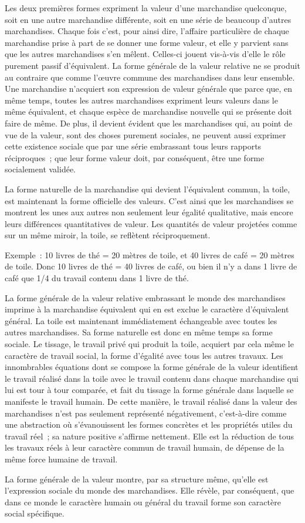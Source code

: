 \documentclass[french,twoside]{book} %
\begin{document}
Les deux premières formes expriment la valeur d’une marchandise quelconque, soit en une autre marchandise différente, soit en une série de beaucoup d’autres marchandises. Chaque fois c’est, pour ainsi dire, l’affaire particulière de chaque marchandise prise à part de se donner une forme valeur, et elle y parvient sans que les autres marchandises s’en mêlent. Celles-ci jouent vis-à-vis d’elle le rôle purement passif d’équivalent. La forme générale de la valeur relative ne se produit au contraire que comme l’œuvre commune des marchandises dans leur ensemble. Une marchandise n’acquiert son expression de valeur générale que parce que, en même temps, toutes les autres marchandises expriment leurs valeurs dans le même équivalent, et chaque espèce de marchandise nouvelle qui se présente doit faire de même. De plus, il devient évident que les marchandises qui, au point de vue de la valeur, sont des choses purement sociales, ne peuvent aussi exprimer cette existence sociale que par une série embrassant tous leurs rapports réciproques ; que leur forme valeur doit, par conséquent, être une forme socialement validée.\par
La forme naturelle de la marchandise qui devient l’équivalent commun, la toile, est maintenant la forme officielle des valeurs. C’est ainsi que les marchandises se montrent les unes aux autres non seulement leur égalité qualitative, mais encore leurs différences quantitatives de valeur. Les quantités de valeur projetées comme sur un même miroir, la toile, se reflètent réciproquement.\par
Exemple : 10 livres de thé = 20 mètres de toile, et 40 livres de café = 20 mètres de toile. Donc 10 livres de thé = 40 livres de café, ou bien il n’y a dans 1 livre de café que 1/4 du travail contenu dans 1 livre de thé.\par
La forme générale de la valeur relative embrassant le monde des marchandises imprime à la marchandise équivalent qui en est exclue le caractère d’équivalent général. La toile est maintenant immédiatement échangeable avec toutes les autres marchandises. Sa forme naturelle est donc en même temps sa forme sociale. Le tissage, le travail privé qui produit la toile, acquiert par cela même le caractère de travail social, la forme d’égalité avec tous les autres travaux. Les innombrables équations dont se compose la forme générale de la valeur identifient le travail réalisé dans la toile avec le travail contenu dans chaque marchandise qui lui est tour à tour comparée, et fait du tissage la forme générale dans laquelle se manifeste le travail humain. De cette manière, le travail réalisé dans la valeur des marchandises n’est pas seulement représenté négativement, c’est-à-dire comme une abstraction où s’évanouissent les formes concrètes et les propriétés utiles du travail réel ; sa nature positive s’affirme nettement. Elle est la réduction de tous les travaux réels à leur caractère commun de travail humain, de dépense de la même force humaine de travail.\par
La forme générale de la valeur montre, par sa structure même, qu’elle est l’expression sociale du monde des marchandises. Elle révèle, par conséquent, que dans ce monde le caractère humain ou général du travail forme son caractère social spécifique.
\end{document}
